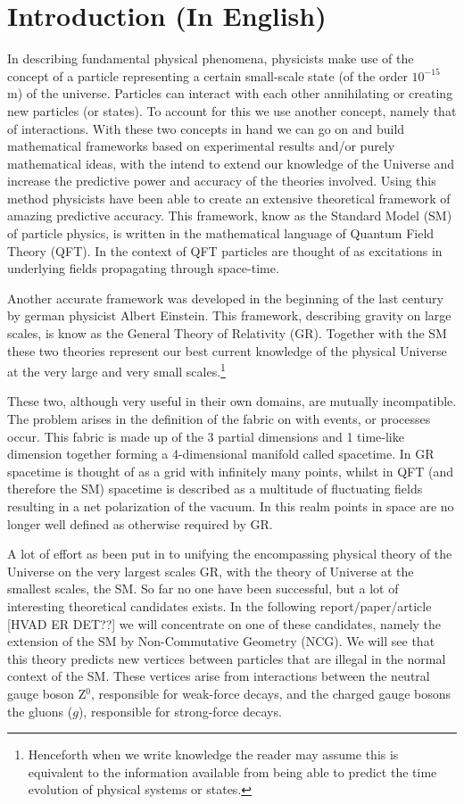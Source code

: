 \section{Introduction (In English)}
In describing fundamental physical phenomena, physicists make use of the concept of a particle representing a certain small-scale state (of the order $10^{-15}$ m) of the universe. Particles can interact with each other annihilating or creating new particles (or states). To account for this we use another concept, namely that of interactions. With these two concepts in hand we can go on and build mathematical frameworks based on experimental results and/or purely mathematical ideas, with the intend to extend our knowledge of the Universe and increase the predictive power and accuracy of the theories involved. Using this method physicists have been able to create an extensive theoretical framework of amazing predictive accuracy. This framework, know as the Standard Model (SM) of particle physics, is written in the mathematical language of Quantum Field Theory (QFT). In the context of QFT particles are thought of as excitations in underlying fields propagating through space-time.

Another accurate framework was developed in the beginning of the last century by german physicist Albert Einstein. This framework, describing gravity on large scales, is know as the General Theory of Relativity (GR). Together with the SM these two theories represent our best current knowledge of the physical Universe at the very large and very small scales.\footnote{Henceforth when we write knowledge the reader may assume this is equivalent to the information available from being able to predict the time evolution of physical systems or states.}

These two, although very useful in their own domains, are mutually incompatible. The problem arises in the definition of the fabric on with events, or processes occur. This fabric is made up of the 3 partial dimensions and 1 time-like dimension together forming a 4-dimensional manifold called spacetime.
In GR spacetime is thought of as a grid with infinitely many points, whilst in QFT (and therefore the SM) spacetime is described as a multitude of fluctuating fields resulting in a net polarization of the vacuum. In this realm points in space are no longer well defined as otherwise required by GR.

A lot of effort as been put in to unifying the encompassing physical theory of the Universe on the very largest scales GR, with the theory of Universe at the smallest scales, the SM. So far no one have been successful, but a lot of interesting theoretical candidates exists. In the following report/paper/article [HVAD ER DET??] we will concentrate on one of these candidates, namely the extension of the SM by Non-Commutative Geometry (NCG). We will see that this theory predicts new vertices between particles that are illegal in the normal context of the SM. These vertices arise from interactions between the neutral gauge boson Z$^0$, responsible for weak-force decays, and the charged gauge bosons the gluons ($g$), responsible for strong-force decays.

